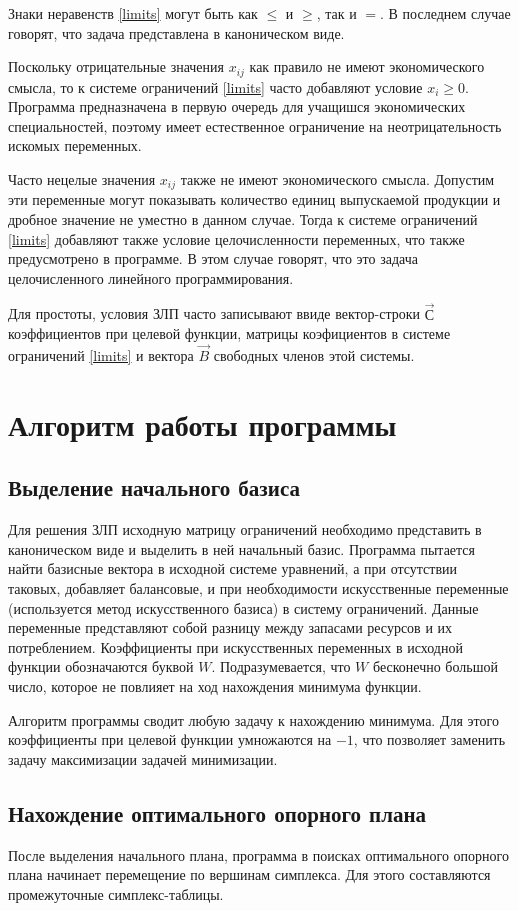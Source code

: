\documentclass[pdftex, unicode, a4paper,12pt,oneside,utf8x, usehyperref]{report-gost}
\begin{document}
Знаки неравенств \eqref{limits} могут быть как $\le$ и $\ge$, так и $=$.
В последнем случае говорят, что задача представлена в каноническом виде.

Поскольку отрицательные значения $x_{ij}$ как правило не имеют экономического смысла,
то к системе ограничений \eqref{limits} часто добавляют условие $x_i \ge 0$. Программа предназначена в первую очередь для учащишся экономических специальностей, поэтому имеет естественное ограничение на неотрицательность искомых переменных.

Часто нецелые значения $x_{ij}$ также не имеют экономического смысла. Допустим эти переменные могут показывать количество единиц выпускаемой продукции и дробное значение не уместно в данном случае. Тогда к системе ограничений \eqref{limits} добавляют также условие целочисленности переменных, что также предусмотрено в программе. В этом случае говорят, что это задача целочисленного линейного программирования.

Для простоты, условия ЗЛП часто записывают ввиде вектор-строки $\vec{С}$ коэффициентов при целевой функции, матрицы коэфициентов в системе ограничений \eqref{limits} и вектора $\vec{B}$ свободных членов этой системы.

\chapter{Алгоритм работы программы}
\section{Выделение начального базиса}
Для решения ЗЛП исходную матрицу ограничений необходимо представить в каноническом виде и выделить в ней начальный базис. Программа пытается найти базисные вектора в исходной системе уравнений, а при отсутствии таковых, добавляет балансовые, и при необходимости искусственные переменные (используется метод искусственного базиса) в систему ограничений.
Данные переменные представляют собой разницу между запасами ресурсов и их потреблением. Коэффициенты при искусственных переменных в исходной функции обозначаются буквой $W$. Подразумевается, что
$W$ бесконечно большой число, которое не повлияет на ход нахождения минимума функции.

Алгоритм программы сводит любую задачу к нахождению минимума. Для этого коэффициенты при целевой функции умножаются на $-1$, что позволяет заменить задачу максимизации задачей минимизации.

\section{Нахождение оптимального опорного плана}
После выделения начального плана, программа в поисках оптимального опорного плана начинает перемещение по вершинам симплекса. Для этого составляются промежуточные симплекс-таблицы.
\end{document}
